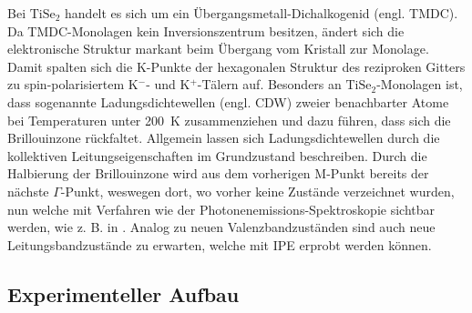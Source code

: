 Bei $\text{TiSe}_2$ handelt es sich um ein Übergangsmetall-Dichalkogenid (engl. TMDC).
Da TMDC-Monolagen kein Inversionszentrum besitzen, ändert sich die elektronische Struktur markant beim Übergang vom Kristall zur Monolage.
Damit spalten sich die K-Punkte der hexagonalen Struktur des reziproken Gitters zu spin-polarisiertem K$^{-}$- und K$^{+}$-Tälern auf. %
Besonders an $\text{TiSe}_2$-Monolagen ist, dass sogenannte Ladungsdichtewellen (engl. CDW) zweier benachbarter Atome bei Temperaturen unter \SI{200}{\kelvin} zusammenziehen und dazu führen, dass sich die Brillouinzone rückfaltet.
Allgemein lassen sich Ladungsdichtewellen durch die kollektiven Leitungseigenschaften im Grundzustand beschreiben.%
Durch die Halbierung der Brillouinzone wird aus dem vorherigen M-Punkt bereits der nächste $\Gamma$-Punkt, weswegen dort, wo vorher keine Zustände verzeichnet wurden, nun welche mit Verfahren wie der Photonenemissions-Spektroskopie sichtbar werden, wie z. B. in \cite{tise_pe}.
Analog zu neuen Valenzbandzuständen sind auch neue Leitungsbandzustände zu erwarten, welche mit IPE erprobt werden können. %


\subsection{Experimenteller Aufbau}

